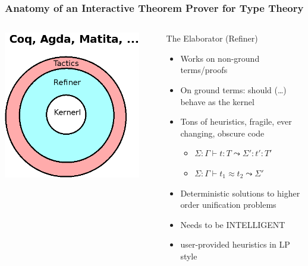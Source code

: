\documentclass{beamer}
\begin{document}
\begin{frame}[fragile]
\frametitle{\small Anatomy of an Interactive Theorem Prover for Type Theory}
\begin{columns}
 \includegraphics[width=0.9\textwidth]{architettura.png}
 \begin{block}{The Elaborator (Refiner)}
  \begin{itemize}
   \item Works on \alert{non-ground terms/proofs}
   \item On ground terms: should (\ldots) behave as the kernel
   \item Tons of \alert{heuristics}, \alert{fragile}, \alert{ever changing}, \alert{obscure code}
    \begin{itemize}
     \item $\Sigma: \Gamma \vdash t : T \leadsto \Sigma': t' : T'$
     \item $\Sigma: \Gamma \vdash t_1 \approx t_2 \leadsto \Sigma'$
    \end{itemize}
   \item Deterministic solutions to higher order unification problems
   \item Needs to be INTELLIGENT
   \item user-provided heuristics in LP style
  \end{itemize}
 \end{block}
\end{columns}
\end{frame}
\end{document}
